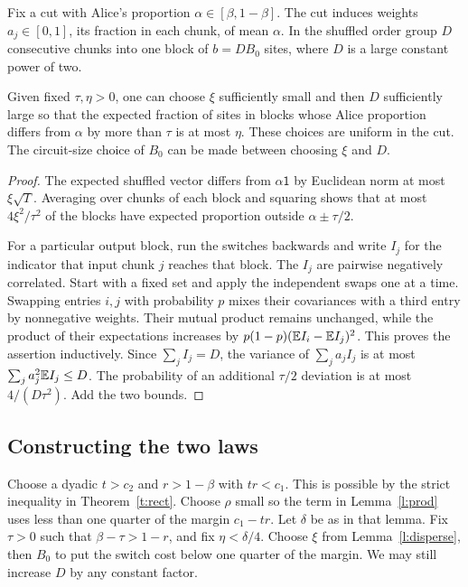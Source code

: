 \documentclass[11pt]{article}
\begin{document}
Fix a cut with Alice's proportion $\alpha\in[\beta,1-\beta]$. The cut induces weights $a_j\in[0,1]$, its fraction in each chunk, of mean $\alpha$. In the shuffled order group $D$ consecutive chunks into one block of $b=DB_0$ sites, where $D$ is a large constant power of two.

\begin{lemma}\label{l:disperse}
Given fixed $\tau,\eta>0$, one can choose $\xi$ sufficiently small and then $D$ sufficiently large so that the expected fraction of sites in blocks whose Alice proportion differs from $\alpha$ by more than $\tau$ is at most $\eta$. These choices are uniform in the cut. The circuit-size choice of $B_0$ can be made between choosing $\xi$ and $D$.
\end{lemma}
\begin{proof}
The expected shuffled vector differs from $\alpha\mathsf{1}$ by Euclidean norm at most $\xi\sqrt T$. Averaging over chunks of each block and squaring shows that at most $4\xi^2/\tau^2$ of the blocks have expected proportion outside $\alpha\pm\tau/2$.

For a particular output block, run the switches backwards and write $I_j$ for the indicator that input chunk $j$ reaches that block. The $I_j$ are pairwise negatively correlated. Start with a fixed set and apply the independent swaps one at a time. Swapping entries $i,j$ with probability $p$ mixes their covariances with a third entry by nonnegative weights. Their mutual product remains unchanged, while the product of their expectations increases by $p(1-p)(\mathbb E I_i-\mathbb E I_j)^2$. This proves the assertion inductively. Since $\sum_j I_j=D$, the variance of $\sum_j a_j I_j$ is at most $\sum_j a_j^2\mathbb E I_j\le D$. The probability of an additional $\tau/2$ deviation is at most $4/(D\tau^2)$. Add the two bounds.
\end{proof}

\subsection{Constructing the two laws}

Choose a dyadic $t>c_2$ and $r>1-\beta$ with $tr<c_1$. This is possible by the strict inequality in Theorem~\ref{t:rect}. Choose $\rho$ small so the term in Lemma~\ref{l:prod} uses less than one quarter of the margin $c_1-tr$. Let $\delta$ be as in that lemma. Fix $\tau>0$ such that $\beta-\tau>1-r$, and fix $\eta<\delta/4$. Choose $\xi$ from Lemma~\ref{l:disperse}, then $B_0$ to put the switch cost below one quarter of the margin. We may still increase $D$ by any constant factor.
\end{document}
